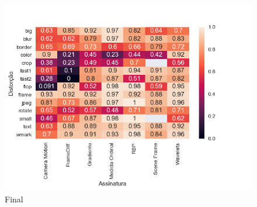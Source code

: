 \begin{figure}[h]
	\centering
	\label{fig:final_heatmap}
	\caption{Final}
	\includegraphics[width=\textwidth]{dados/figuras/experimentos/heatmap_final.png}
\end{figure}


